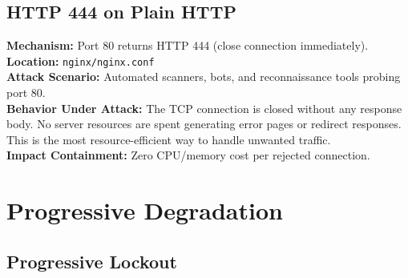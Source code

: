 \documentclass[11pt,a4paper]{article}
\begin{document}
\subsection{HTTP 444 on Plain HTTP}

\begin{tcolorbox}[colback=toleranceamber!5, colframe=toleranceamber]
\textbf{Mechanism:} Port 80 returns HTTP 444 (close connection immediately).\\
\textbf{Location:} \texttt{nginx/nginx.conf}\\
\textbf{Attack Scenario:} Automated scanners, bots, and reconnaissance tools probing port 80.\\
\textbf{Behavior Under Attack:} The TCP connection is closed without any response body. No server resources are spent generating error pages or redirect responses. This is the most resource-efficient way to handle unwanted traffic.\\
\textbf{Impact Containment:} Zero CPU/memory cost per rejected connection.
\end{tcolorbox}

\section{Progressive Degradation}

\subsection{Progressive Lockout}
\end{document}
